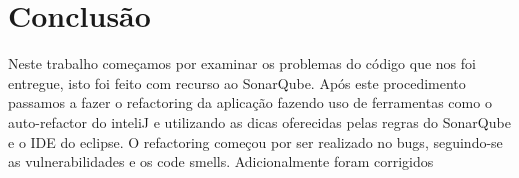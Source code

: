 \vspace{1cm}
\section{Conclusão}

Neste trabalho começamos por examinar os problemas do código que nos foi entregue, isto foi feito com recurso ao SonarQube. Após este procedimento passamos a fazer o refactoring da aplicação fazendo uso de ferramentas como o auto-refactor do inteliJ e utilizando as dicas oferecidas pelas regras do SonarQube e o IDE do eclipse. O refactoring começou por ser realizado no bugs, seguindo-se as vulnerabilidades e os code smells. Adicionalmente foram corrigidos    
